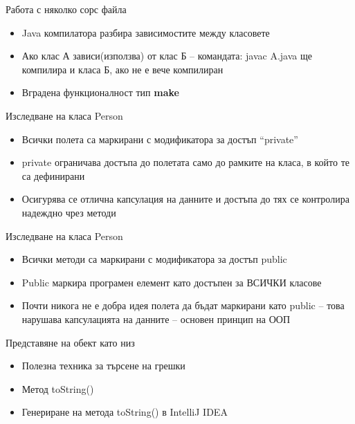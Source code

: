 \documentclass{beamer}
\begin{document}
\begin{frame}{Работа с няколко сорс файла}
  \transdissolve
  \begin{itemize}
  \item Java компилатора разбира
    зависимостите между класовете
  \item Ако клас А зависи(използва) от клас Б –
    командата:
    javac A.java
    ще компилира и класа Б, ако не е вече
    компилиран
   \item Вградена функционалност тип \textbf{make}
  \end{itemize}
\end{frame}

\begin{frame}{Изследване на класа Person}
  \transdissolve
  \begin{itemize}
  \item Всички полета са маркирани с
    модификатора за достъп “private”
   \item private ограничава достъпа до полетата
    само до рамките на класа, в който те са
    дефинирани
   \item Осигурява се отлична капсулация на
    данните и достъпа до тях се контролира
    надеждно чрез методи
  \end{itemize}
\end{frame}

\begin{frame}{Изследване на класа Person}
  \transdissolve
  \begin{itemize}
  \item Всички методи са маркирани с
    модификатора за достъп public
  \item Public маркира програмен елемент като
    достъпен за ВСИЧКИ класове
  \item Почти никога не е добра идея полета да
    бъдат маркирани като public – това
    нарушава капсулацията на данните –
    основен принцип на ООП
  \end{itemize}
\end{frame}

\begin{frame}{Представяне на обект като низ}
  \transdissolve
  \begin{itemize}
  \item Полезна техника за търсене на грешки
  \item Метод toString()
  \item Генериране на метода toString() в IntelliJ IDEA
  \end{itemize}
\end{frame}
\end{document}
